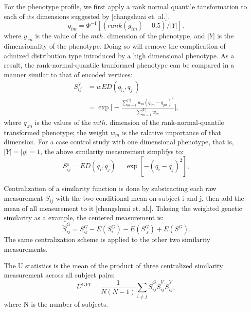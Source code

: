 \documentclass[twocolumn]{article}
\begin{document}
For the phenotype profile, we first apply a rank normal quantile tansformation to each of its dimensions suggested by [changshuai et. al.]. 
\begin{displaymath}
  q_{im}=\Phi^{-1}[(rank(y_{im})-0.5)/|Y|],
\end{displaymath} 
where $y_{.m}$ is the value of the $m th.$ dimension of the phenotype, and $|Y|$ is the dimensionality of the phenotype. Doing so will remove the complication of admixed distribution type introduced by a high dimensional phenotype. As a result, the rank-normal-quantile tranformed phenotype can be compared in a manner similar to that of encoded vertices:
\begin{equation} \label{eq_wSY}
\begin{split}
  S_{ij}^Y &= wED(q_{i.},q_{j.}) \\
  &=\exp
  {
    \Big[-\frac{\sum_{m=1}^{|Y|}{w_m(q_{im}-q_{jm})^2}} {\sum_{m=1}^{|Y|}{w_m}}\Big]
  },
\end{split}
\end{equation}
where $q_{.m}$ is the values of the $m th.$ dimension of the rank-normal-quantile transformed phenotype; the weight $w_m$ is the ralative importance of that dimension. For a case control study with one dimensional phenotype, that is, $|Y|=|y|=1$, the above similarity measurement simplifys to:
\begin{displaymath}
  S_{ij}^{y}=ED(q_i,q_j)=\exp{[-(q_i-q_j)^2]},
\end{displaymath}

Centralization of a similarity function is done by substracting each raw measurement $S_{ij}$ with the two conditional mean on subject i and j, then add the mean of all measurement to it [changshuai et. al.]. Takeing the weighted genetic similarity as a example, the centered measurement is:
\begin{displaymath}
  \tilde{S}_{ij}^{G}=S_{ij}^{G}-E(S_{i.}^{G})-E(S_{.j}^{G})+E(S_{..}^{G}).
\end{displaymath}
The same centralization scheme is applied to the other two similarity measurements.

The U statistics is the mean of the product of three centralized similarity measurement across all subject pairs:
\begin{displaymath}
  U^{GVY}=\frac{1}{N(N-1)}\sum_{i \neq j} \tilde{S}_{ij}^{G} \tilde{S}_{ij}^{V} \tilde{S}_{ij}^{Y},
\end{displaymath}
where N is the number of subjects.
\end{document}
